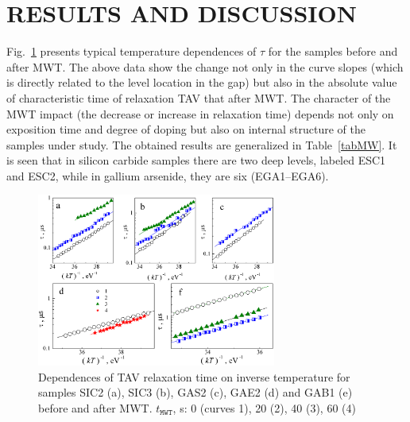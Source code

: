 \documentclass[%
 aip,jap,
 amsmath,amssymb,
 reprint,%
]{revtex4-1}
\begin{document}
\section{\label{sec:Rez}RESULTS AND DISCUSSION}

Fig.~\ref{figTauTAV} presents typical temperature dependences of $\tau$ for the samples before and after MWT.
The above data show the change not only in the curve slopes (which is directly related to the level location in the gap)
but also in the absolute value of  characteristic time of relaxation TAV that after MWT.
The character of the MWT impact (the decrease or increase in relaxation time) depends not only on exposition time and degree of doping but also on internal structure of the samples under study.
The obtained results are generalized in Table~\ref{tabMW}.
It is seen that in silicon carbide samples there are two deep levels, labeled ESC1 and ESC2, while in gallium arsenide, they are six (EGA1–EGA6).



\begin{figure}
\includegraphics[width=0.7\textwidth]{Fig3}
\caption{\label{figTauTAV}
Dependences of TAV relaxation time on inverse temperature for samples SIC2 (a), SIC3 (b), GAS2 (c), GAE2 (d) and GAB1 (e) before and after MWT.
$t_\mathtt{MWT}$, s: 0 (curves 1), 20 (2), 40 (3), 60 (4)
}%
\end{figure}
\end{document}
